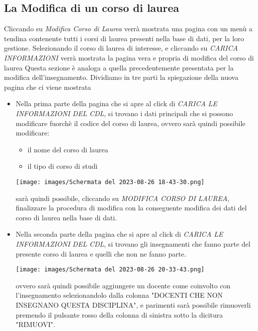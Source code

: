 \documentclass{article}
\begin{document}
    \subsection{La Modifica di un corso di laurea}
    Cliccando su \textit{Modifica Corso di Laurea} verrà mostrata una pagina con un menù a tendina contenente tutti i corsi di laurea presenti nella base di dati, per la loro gestione. Selezionando il corso di laurea di interesse, e cliccando su \textit{CARICA INFORMAZIONI} verrà mostrata la pagina vera e propria di modifica del corso di laurea
    Questa sezione è analoga a quella precedentemente presentata per la modifica dell'insegnamento.
    Dividiamo in tre parti la spiegazione della nuova pagina che ci viene mostrata
    \begin{itemize}
        \item Nella prima parte della pagina che si apre al click di \textit{CARICA LE INFORMAZIONI DEL CDL}, si trovano i dati principali che si possono modificare fuorchè il codice del corso di laurea, ovvero sarà quindi possibile modificare:
        \begin{itemize}
            \item il nome del corso di laurea
            \item il tipo di corso di studi
        \end{itemize}

        \begin{center}
            \texttt{[image: images/Schermata del 2023-08-26 18-43-30.png]}
        \end{center}

        sarà quindi possibile, cliccando su \textit{MODIFICA CORSO DI LAUREA}, finalizzare la procedura di modifica con la conseguente modifica dei dati del corso di laurea nella base di dati.

        \item Nella seconda parte della pagina che si apre al click di \textit{CARICA LE INFORMAZIONI DEL CDL}, si trovano gli insegnamenti che fanno parte del presente corso di laurea e quelli che non ne fanno parte.

        \begin{center}
            \texttt{[image: images/Schermata del 2023-08-26 20-33-43.png]}
        \end{center}

        ovvero sarà quindi possibile aggiungere un docente come coinvolto con l'insegnamento selezionandolo dalla colonna "DOCENTI CHE NON INSEGNANO QUESTA DISCIPLINA", e parimenti sarà possibile rimuoverli premendo il pulsante rosso della colonna di sinistra sotto la dicitura "RIMUOVI".


\end{itemize}
\end{document}
